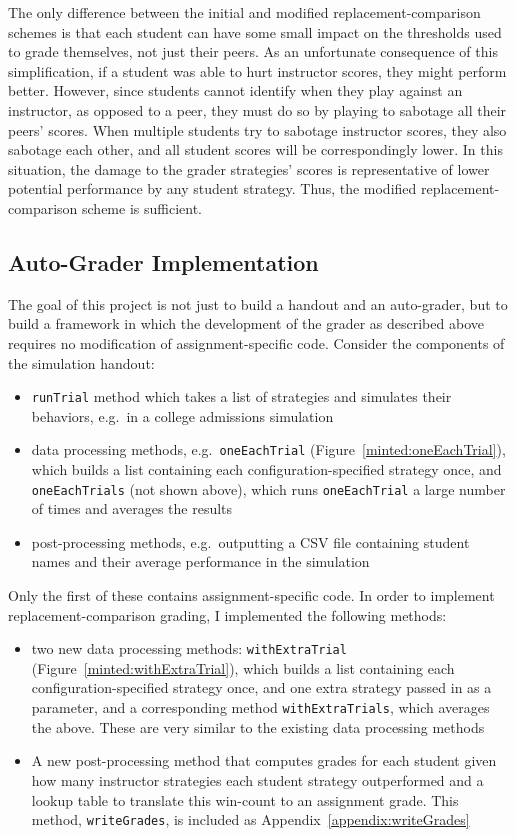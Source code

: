 \documentclass[pageno]{jpaper}
\begin{document}
The only difference between the initial and modified replacement-comparison schemes is that each student can have some small impact on the thresholds used to grade themselves, not just their peers.
As an unfortunate consequence of this simplification, if a student was able to hurt instructor scores, they might perform better.
However, since students cannot identify when they play against an instructor, as opposed to a peer, they must do so by playing to sabotage all their peers' scores.
When multiple students try to sabotage instructor scores, they also sabotage each other, and all student scores will be correspondingly lower.
In this situation, the damage to the grader strategies' scores is representative of lower potential performance by any student strategy.
Thus, the modified replacement-comparison scheme is sufficient.

\subsection*{Auto-Grader Implementation}
The goal of this project is not just to build a handout and an auto-grader, but to build a framework in which the development of the grader as described above requires no modification of assignment-specific code.
Consider the components of the simulation handout:
\begin{itemize}
\item
  \texttt{runTrial} method which takes a list of strategies and simulates their behaviors, e.g.\ in a college admissions simulation
\item
  data processing methods, e.g.\ \texttt{oneEachTrial} (Figure~\ref{minted:oneEachTrial}), which builds a list containing each configuration-specified strategy once, and \texttt{oneEachTrials} (not shown above), which runs \texttt{oneEachTrial} a large number of times and averages the results
\item
  post-processing methods, e.g.\ outputting a CSV file containing student names and their average performance in the simulation
\end{itemize}

Only the first of these contains assignment-specific code.
In order to implement replacement-comparison grading, I implemented the following methods:

\begin{itemize}
\item
  two new data processing methods: \texttt{withExtraTrial} (Figure~\ref{minted:withExtraTrial}), which builds a list containing each configuration-specified strategy once, and one extra strategy passed in as a parameter, and a corresponding method \texttt{withExtraTrials}, which averages the above.
  These are very similar to the existing data processing methods
\item
  A new post-processing method that computes grades for each student given how many instructor strategies each student strategy outperformed and a lookup table to translate this win-count to an assignment grade.
  This method, \texttt{writeGrades}, is included as Appendix~\ref{appendix:writeGrades}
\end{itemize}
\end{document}
